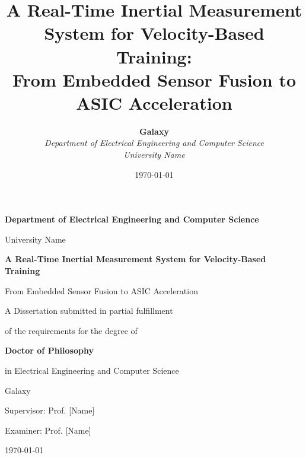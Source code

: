\documentclass[12pt,a4paper,oneside]{book}
\title{
    \textbf{A Real-Time Inertial Measurement System for Velocity-Based Training:}\\[0.8em]
    \textbf{From Embedded Sensor Fusion to ASIC Acceleration}
}
\author{
    \textbf{Galaxy}\\[1em]
    \textit{Department of Electrical Engineering and Computer Science}\\
    \textit{University Name}
}
\date{\today}
\begin{document}
\begin{titlepage}
    \centering
    \vspace*{1cm}

    {\Large\bfseries Department of Electrical Engineering and Computer Science\par}
    \vspace{0.5cm}
    {\Large University Name\par}

    \vspace{2.5cm}

    {\Huge\bfseries A Real-Time Inertial Measurement System for Velocity-Based Training \par}
    \vspace{0.5cm}
    {\large From Embedded Sensor Fusion to ASIC Acceleration \par}

    \vspace{2cm}

    {\large A Dissertation submitted in partial fulfillment\par}
    {\large of the requirements for the degree of\par}
    \vspace{0.5cm}
    {\huge\bfseries Doctor of Philosophy\par}
    \vspace{0.5cm}
    {\large in Electrical Engineering and Computer Science\par}

    \vspace{2.5cm}

    \begin{minipage}{0.5\textwidth}
    \centering
    {\large Galaxy\par}
    \end{minipage}

    \vfill

    \begin{minipage}{0.5\textwidth}
    \centering
    Supervisor: Prof. [Name]\par
    Examiner: Prof. [Name]\par
    \end{minipage}

    \vspace{1cm}
    {\large \today\par}
    \vspace{2cm}
\end{titlepage}
\end{document}
